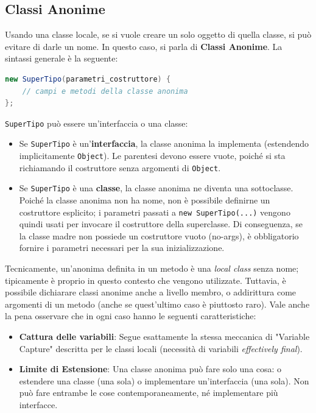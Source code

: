 \subsection{Classi Anonime}
Usando una classe locale, se si vuole creare un solo oggetto di quella classe, si può evitare di darle un nome. In questo caso, si parla di \textbf{Classi Anonime}. La sintassi generale è la seguente:

\begin{lstlisting}[language=Java, caption={Sintassi di una classe anonima}]
new SuperTipo(parametri_costruttore) {
    // campi e metodi della classe anonima
};
\end{lstlisting}

\texttt{SuperTipo} può essere un'interfaccia o una classe:
\begin{itemize}
    \item Se \texttt{SuperTipo} è un'\textbf{interfaccia}, la classe anonima la implementa (estendendo implicitamente \texttt{Object}). Le parentesi devono essere vuote, poiché si sta richiamando il costruttore senza argomenti di \texttt{Object}.
    \item Se \texttt{SuperTipo} è una \textbf{classe}, la classe anonima ne diventa una sottoclasse. Poiché la classe anonima non ha nome, non è possibile definirne un costruttore esplicito; i parametri passati a \texttt{new SuperTipo(...)} vengono quindi usati per invocare il costruttore della superclasse. Di conseguenza, se la classe madre non possiede un costruttore vuoto (no-args), è obbligatorio fornire i parametri necessari per la sua inizializzazione.
\end{itemize}
\vspace{\baselineskip}
Tecnicamente, un'anonima definita in un metodo è una \textit{local class} senza nome; tipicamente è proprio in questo contesto che vengono utilizzate. Tuttavia, è possibile dichiarare classi anonime anche a livello membro, o addirittura come argomenti di un metodo (anche se quest'ultimo caso è piuttosto raro). Vale anche la pena osservare che in ogni caso hanno le seguenti caratteristiche:
\begin{itemize}
    \item \textbf{Cattura delle variabili}: Segue esattamente la stessa meccanica di "Variable Capture" descritta per le classi locali (necessità di variabili \textit{effectively final}).
    \item\textbf{Limite di Estensione}: Una classe anonima può fare solo una cosa: o estendere una classe (una sola) o implementare un'interfaccia (una sola). Non può fare entrambe le cose contemporaneamente, né implementare più interfacce.
\end{itemize}



